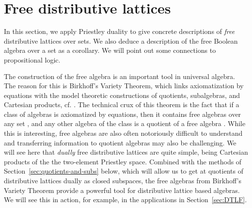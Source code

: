 \section{Free distributive lattices} \label{sec:free-description}

 In this section, we apply Priestley duality to give concrete descriptions of \emph{free} distributive lattices over sets. We also deduce a description of the free Boolean algebra over a set as a corollary. We will point out some connections to propositional logic.

The construction of the free algebra is an important tool in universal algebra. The reason for this is Birkhoff's Variety Theorem, which links axiomatization by equations with the model theoretic constructions of quotients, subalgebras, and Cartesian products, cf. \cite[Theorem~11.9]{BurSan2000}. The technical crux of this theorem is the fact that if a class of algebras is axiomatized by equations, then it contains free algebras over any set \cite[Theorem~10.12]{BurSan2000}, and any other algebra of the class is a quotient of a free algebra \cite[Corollary~10.11]{BurSan2000}. While this is interesting, free algebras are also often notoriously difficult to understand and transferring information to quotient algebras may also be challenging. We will see here that \emph{dually} free distributive lattices are quite simple, being Cartesian products of the the two-element Priestley space. Combined with the methods of Section~\ref{sec:quotients-and-subs} below, which will allow us to get at quotients of distributive lattices dually as closed subspaces, the free algebras from Birkhoff's Variety Theorem provide a powerful tool for distributive lattice based algebras. We will see this in action, for example, in the applications in Section~\ref{sec:DTLF}.

